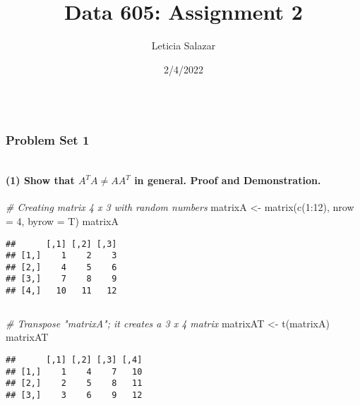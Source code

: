 \documentclass[
]{article}
\title{Data 605: Assignment 2}
\author{Leticia Salazar}
\date{2/4/2022}
\newenvironment{Shaded}{\begin{snugshade}}{\end{snugshade}}
\newcommand{\AttributeTok}[1]{\textcolor[rgb]{0.77,0.63,0.00}{#1}}
\newcommand{\CommentTok}[1]{\textcolor[rgb]{0.56,0.35,0.01}{\textit{#1}}}
\newcommand{\DecValTok}[1]{\textcolor[rgb]{0.00,0.00,0.81}{#1}}
\newcommand{\FunctionTok}[1]{\textcolor[rgb]{0.00,0.00,0.00}{#1}}
\newcommand{\NormalTok}[1]{#1}
\newcommand{\OtherTok}[1]{\textcolor[rgb]{0.56,0.35,0.01}{#1}}
\newcommand{\SpecialCharTok}[1]{\textcolor[rgb]{0.00,0.00,0.00}{#1}}
\begin{document}
\maketitle

{
\setcounter{tocdepth}{2}
\tableofcontents
}
\(~\)

\hypertarget{problem-set-1}{%
\subsubsection{Problem Set 1}\label{problem-set-1}}

\(~\)

\hypertarget{show-that-ata-ne-aat-in-general.-proof-and-demonstration.}{%
\paragraph{\texorpdfstring{(1) Show that \emph{\(A^TA \ne AA^T\)} in
general. Proof and
Demonstration.}{(1) Show that A\^{}TA \textbackslash ne AA\^{}T in general. Proof and Demonstration.}}\label{show-that-ata-ne-aat-in-general.-proof-and-demonstration.}}

\begin{Shaded}
\begin{Highlighting}[]
\CommentTok{\# Creating matrix 4 x 3 with random numbers}
\NormalTok{matrixA }\OtherTok{\textless{}{-}} \FunctionTok{matrix}\NormalTok{(}\FunctionTok{c}\NormalTok{(}\DecValTok{1}\SpecialCharTok{:}\DecValTok{12}\NormalTok{), }\AttributeTok{nrow =} \DecValTok{4}\NormalTok{, }\AttributeTok{byrow =}\NormalTok{ T)}
\NormalTok{matrixA}
\end{Highlighting}
\end{Shaded}

\begin{verbatim}
##      [,1] [,2] [,3]
## [1,]    1    2    3
## [2,]    4    5    6
## [3,]    7    8    9
## [4,]   10   11   12
\end{verbatim}

\(~\)

\begin{Shaded}
\begin{Highlighting}[]
\CommentTok{\# Transpose "matrixA"; it creates a 3 x 4 matrix}
\NormalTok{matrixAT }\OtherTok{\textless{}{-}} \FunctionTok{t}\NormalTok{(matrixA)}
\NormalTok{matrixAT}
\end{Highlighting}
\end{Shaded}

\begin{verbatim}
##      [,1] [,2] [,3] [,4]
## [1,]    1    4    7   10
## [2,]    2    5    8   11
## [3,]    3    6    9   12
\end{verbatim}
\end{document}
